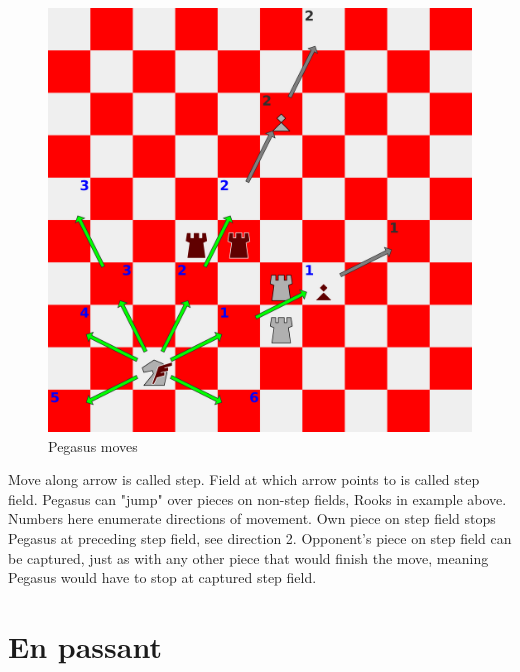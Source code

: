 \documentclass[a5paper,12pt,draft]{book} %
\begin{document}
\noindent
\begin{figure}[!t]
\includegraphics[width=1.0\textwidth, keepaspectratio=true]{../gfx/examples/03_move_pegasus.png}
\caption{Pegasus moves}
\label{fig:pegasus_moves}
\end{figure}
\indent
Move along arrow is called step. Field at which arrow points to is called step field.
Pegasus can "jump" over pieces on non-step fields, Rooks in example above. Numbers
here enumerate directions of movement. Own piece on step field stops Pegasus at
preceding step field, see direction 2. Opponent's piece on step field can be captured,
just as with any other piece that would finish the move, meaning Pegasus would have to
stop at captured step field.

\clearpage

\section*{En passant}
\end{document}

